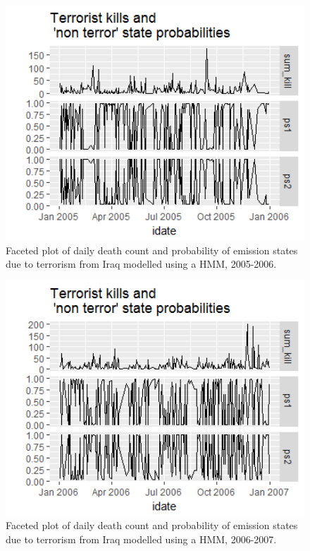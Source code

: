 \begin{figure}[t]
\includegraphics[width=15cm]{Peters_experiment_markdown_files/figure-latex/Rplot02_2005-2006_hmm.png}
\caption{Faceted plot of daily death count and probability of emission states due to terrorism from Iraq modelled using a HMM, 2005-2006.}
\label{fig:Rplot02_2005_2006}
\centering
\end{figure}

\begin{figure}[t]
\includegraphics[width=15cm]{Peters_experiment_markdown_files/figure-latex/Rplot02_2006_2007.png}
\caption{Faceted plot of daily death count and probability of emission states due to terrorism from Iraq modelled using a HMM, 2006-2007.}
\label{fig:Rplot02_2006_2007}
\centering
\end{figure}

